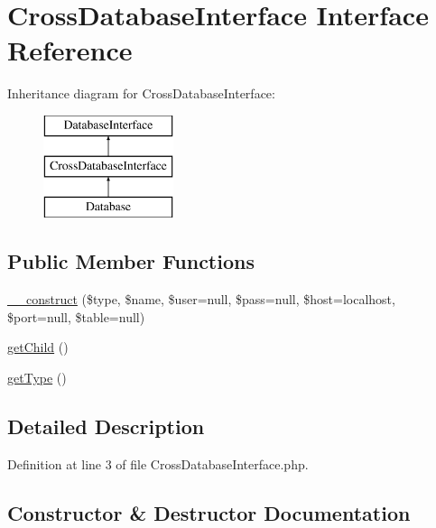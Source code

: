 \hypertarget{interface_cross_database_interface}{}\section{Cross\+Database\+Interface Interface Reference}
\label{interface_cross_database_interface}
Inheritance diagram for Cross\+Database\+Interface\+:\begin{figure}[H]
\begin{center}
\leavevmode
\includegraphics[height=3.000000cm]{interface_cross_database_interface}
\end{center}
\end{figure}
\subsection*{Public Member Functions}
\begin{DoxyCompactItemize}
\item 
\hyperlink{interface_cross_database_interface_ad39d523c1d86281b5776378c1261503d}{\+\_\+\+\_\+construct} (\$type, \$name, \$user=null, \$pass=null, \$host=\textquotesingle{}localhost\textquotesingle{}, \$port=null, \$table=null)
\item 
\hyperlink{interface_cross_database_interface_a42e46ac9d1969ac9ce906608730be110}{get\+Child} ()
\item 
\hyperlink{interface_cross_database_interface_a830b5c75df72b32396701bc563fbe3c7}{get\+Type} ()
\end{DoxyCompactItemize}


\subsection{Detailed Description}


Definition at line 3 of file Cross\+Database\+Interface.\+php.



\subsection{Constructor \& Destructor Documentation}
\hypertarget{interface_cross_database_interface_ad39d523c1d86281b5776378c1261503d}{}
